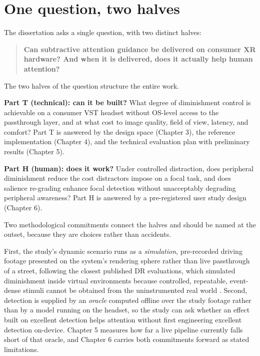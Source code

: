 \section{One question, two halves}

The dissertation asks a single question, with two distinct halves:

\begin{quote}
\textbf{Can subtractive attention guidance be delivered on consumer XR hardware? And when it is
delivered, does it actually help human attention?}
\end{quote}

The two halves of the question structure the entire work.

\textbf{Part T (technical): can it be built?} What degree of diminishment control is achievable on a
consumer VST headset without OS-level access to the passthrough layer, and at what cost to image
quality, field of view, latency, and comfort? Part T is answered by the design space (Chapter 3), the
reference implementation (Chapter 4), and the technical evaluation plan with preliminary results
(Chapter 5).

\textbf{Part H (human): does it work?} Under controlled distraction, does peripheral diminishment reduce
the cost distractors impose on a focal task, and does salience re-grading enhance focal detection
without unacceptably degrading peripheral awareness? Part H is answered by a pre-registered user
study design (Chapter 6).

Two methodological commitments connect the halves and should be named at the outset, because they are
choices rather than accidents.

First, the study's dynamic scenario runs as a \textit{simulation}, pre-recorded driving footage
presented on the system's rendering sphere rather than live passthrough of a street, following the
closest published DR evaluations, which simulated diminishment inside virtual environments because
controlled, repeatable, event-dense stimuli cannot be obtained from the uninstrumented real world
\citep{cheng2022,mclaughlin2025}. Second, detection is supplied by an \textit{oracle}
computed offline over the study footage rather than by a model running on the headset, so the study
can ask whether an effect built on excellent detection helps attention without first engineering
excellent detection on-device. Chapter 5 measures how far a live pipeline currently falls short of
that oracle, and Chapter 6 carries both commitments forward as stated limitations.

